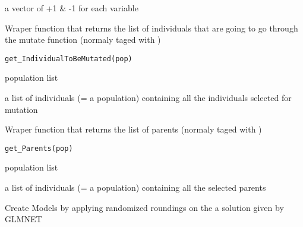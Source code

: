 \documentclass[a4paper]{book}
\begin{document}
%
\begin{Value}
a vector of +1 \& -1 for each variable
\end{Value}
%
\begin{Description}
Wraper function that returns the list of individuals that are going to go through 
the mutate function (normaly taged with )
\end{Description}
%
\begin{Usage}
\begin{verbatim}
get_IndividualToBeMutated(pop)
\end{verbatim}
\end{Usage}
%
\begin{Arguments}
\begin{ldescription}
\item[\code{pop:}] population list
\end{ldescription}
\end{Arguments}
%
\begin{Value}
a list of individuals (= a population) containing all the individuals selected for mutation
\end{Value}
%
\begin{Description}
Wraper function that returns the list of parents (normaly taged with 
)
\end{Description}
%
\begin{Usage}
\begin{verbatim}
get_Parents(pop)
\end{verbatim}
\end{Usage}
%
\begin{Arguments}
\begin{ldescription}
\item[\code{pop:}] population list
\end{ldescription}
\end{Arguments}
%
\begin{Value}
a list of individuals (= a population) containing all the selected parents
\end{Value}
%
\begin{Description}
Create Models by applying randomized roundings on the a solution given by GLMNET
\end{Description}
\end{document}
